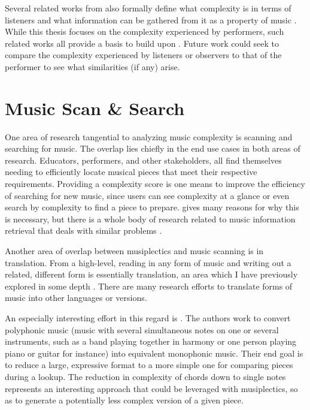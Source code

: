 \documentclass[12pt]{report}
\begin{document}
Several related works from \cite{streich2006automatic} also formally define what complexity is in terms of listeners and what information can be gathered from it as a property of music \cite{edmonds1995complexity} \cite{pressing1999cognitive} \cite{scheirer2000perceived}. While this thesis focuses on the complexity experienced by performers, such related works all provide a basis to build upon \cite{Knuth:1984:CS:358027.358042}. Future work could seek to compare the complexity experienced by listeners or observers to that of the performer to see what similarities (if any) arise.

\section{Music Scan \& Search}
\label{sec:relscan}

One area of research tangential to analyzing music complexity is scanning and searching for music. The overlap lies chiefly in the end use cases in both areas of research. Educators, performers, and other stakeholders, all find themselves needing to efficiently locate musical pieces that meet their respective requirements. Providing a complexity score is one means to improve the efficiency of searching for new music, since users can see complexity at a glance or even search by complexity to find a piece to prepare. \cite{Byrd2001} gives many reasons for why this is necessary, but there is a whole body of research related to music information retrieval that deals with similar problems \cite{downie2003music} \cite{casey2008content}.

Another area of overlap between musiplectics and music scanning is in translation. From a high-level, reading in any form of music and writing out a related, different form is essentially translation, an area which I have previously explored in some depth \cite{holder2013cloudASE} \cite{holder2013cloudSPLASH} \cite{holder2014native}. There are many research efforts to translate forms of music into other languages or versions.

An especially interesting effort in this regard is \cite{Allali2009}. The authors work to convert polyphonic music (music with several simultaneous notes on one or several instruments, such as a band playing together in harmony or one person playing piano or guitar for instance) into equivalent monophonic music. Their end goal is to reduce a large, expressive format to a more simple one for comparing pieces during a lookup. The reduction in complexity of chords down to single notes represents an interesting approach that could be leveraged with musiplectics, so as to generate a potentially less complex version of a given piece.
\end{document}
